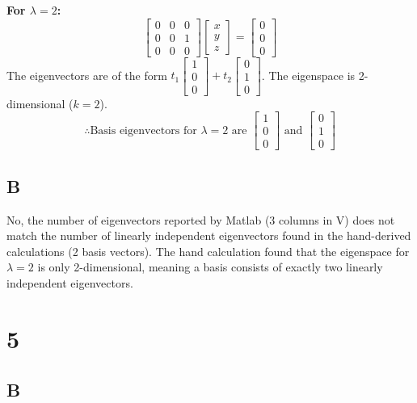\documentclass{article}
\newcommand{\mat}[1]{\begin{bmatrix} #1 \end{bmatrix}}
\newcommand{\vect}[1]{\begin{bmatrix} #1 \end{bmatrix}}
\begin{document}
\textbf{For $\lambda = 2$:}
\[
	\mat{ 0 & 0 & 0 \\ 0 & 0 & 1 \\ 0 & 0 & 0 } \vect{x \\ y \\ z} = \vect{0 \\ 0 \\ 0}
\]
The eigenvectors are of the form $ t_1 \vect{1 \\ 0 \\ 0} + t_2 \vect{0 \\ 1 \\ 0}$.
The eigenspace is 2-dimensional ($k=2$).
\[
	\therefore \text{Basis eigenvectors for } \lambda = 2 \text{ are } \vect{1 \\ 0 \\ 0} \text{ and } \vect{0 \\ 1 \\ 0}
\]

\subsection*{B}

No, the number of eigenvectors reported by Matlab (3 columns in V) does not match the number of linearly independent eigenvectors found in the hand-derived calculations (2 basis vectors). The hand calculation found that the eigenspace for $\lambda=2$ is only 2-dimensional, meaning a basis consists of exactly two linearly independent eigenvectors.

\section*{5}

\subsection*{B}
\end{document}
